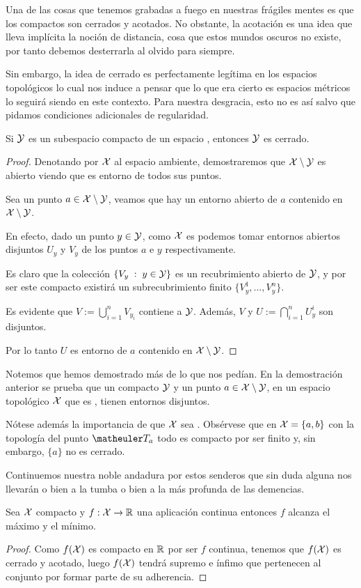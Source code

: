 Una de las cosas que tenemos grabadas a fuego en nuestras frágiles mentes es que los compactos son cerrados y acotados. No obstante, la acotación es una idea que lleva implícita la noción de distancia, cosa que estos mundos oscuros no existe, por tanto debemos desterrarla al olvido para siempre.

Sin embargo, la idea de cerrado es perfectamente legítima en los espacios topológicos lo cual nos induce a pensar que lo que era cierto es espacios métricos lo seguirá siendo en este contexto. Para nuestra desgracia, esto no es así salvo que pidamos condiciones adicionales de regularidad.

\begin{prop}\label{comp_prop_compCerrado}
	Si $\mathcal{Y}$ es un subespacio compacto de un espacio  \hausdorff, entonces $\mathcal{Y}$ es cerrado.
\end{prop}
\begin{proof}
	Denotando por $\mathcal{X}$ al espacio \hausdorff ambiente, demostraremos que $\mathcal{X}\setminus \mathcal{Y}$ es abierto viendo que es entorno de todos sus puntos.
	
	Sea un punto $a\in\mathcal{X}\setminus \mathcal{Y}$, veamos que hay un entorno abierto de $a$ contenido en $\mathcal{X}\setminus \mathcal{Y}$.
	
	En efecto, dado un punto $y \in \mathcal{Y}$, como $\mathcal{X}$ es \hausdorff podemos tomar entornos abiertos disjuntos $U_y$ y $V_y$ de los puntos $a$ e $y$ respectivamente.
	
	Es claro que la colección $\{V_y \;:\; y \in \mathcal{Y}\}$ es un recubrimiento abierto de $\mathcal{Y}$, y por ser este compacto existirá un subrecubrimiento finito $\{V_y^1,\dots,V_y^n\}$.
	
	Es evidente que $V:=\bigcup_{i=1}^nV_{y_i}$ contiene a $\mathcal{Y}$. Además, $V$ y $U := \bigcap_{i=1}^nU_y^i$ son disjuntos.
	
	Por lo tanto $U$ es entorno de $a$ contenido en $\mathcal{X}\setminus\mathcal{Y}$.
\end{proof}

\begin{obs}\label{comp_obs_compSep}
	Notemos que hemos demostrado más de lo que nos pedían. En la demostración anterior se prueba que un compacto $\mathcal{Y}$ y un punto $a\in \mathcal{X}\setminus \mathcal{Y}$, en un espacio topológico $\mathcal{X}$ que es \hausdorff, tienen entornos disjuntos.
	
	Nótese además la importancia de que $\mathcal{X}$ sea \hausdorff. Obsérvese que en $\mathcal{X}=\{a,b\}$ con la topología del punto $\T_a$ todo es compacto por ser finito y, sin embargo, $\{a\}$ no es cerrado.
\end{obs}
Continuemos nuestra noble andadura por estos senderos que sin duda alguna nos llevarán o bien a la tumba o bien a la más profunda de las demencias.
\begin{prop}[Weierstrass]\label{comp_prop_weierstrass}
	Sea $\mathcal{X}$ compacto y $f:\mathcal{X}\to\mathbb{R}$ una aplicación continua entonces $f$ alcanza el máximo y el mínimo.
\end{prop}
\begin{proof}
	Como $f(\mathcal{X})$ es compacto en $\mathbb{R}$ por ser $f$ continua, tenemos que $f(\mathcal{X})$ es cerrado y acotado, luego $f(\mathcal{X})$ tendrá supremo e ínfimo que pertenecen al conjunto por formar parte de su adherencia.
\end{proof}

